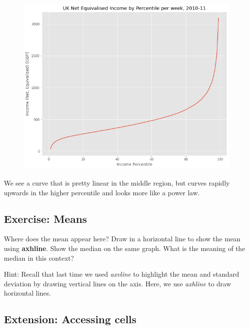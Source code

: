 \documentclass[
  letterpaper,
  DIV=11,
  numbers=noendperiod]{scrreprt}
\begin{document}
\begin{figure}[H]

{\centering \includegraphics{notebooks/W02. Pandas_files/figure-pdf/cell-13-output-2.png}

}

\end{figure}

We see a curve that is pretty linear in the middle region, but curves
rapidly upwards in the higher percentile and looks more like a power
law.

\hypertarget{exercise-means}{%
\subsection{Exercise: Means}\label{exercise-means}}

Where does the mean appear here? Draw in a horizontal line to show the
mean using \textbf{axhline}. Show the median on the same graph. What is
the meaning of the median in this context?

Hint: Recall that last time we used \emph{axvline} to highlight the mean
and standard deviation by drawing vertical lines on the axis. Here, we
use \emph{axhline} to draw horizontal lines.

\hypertarget{extension-accessing-cells}{%
\subsection{Extension: Accessing
cells}\label{extension-accessing-cells}}
\end{document}
